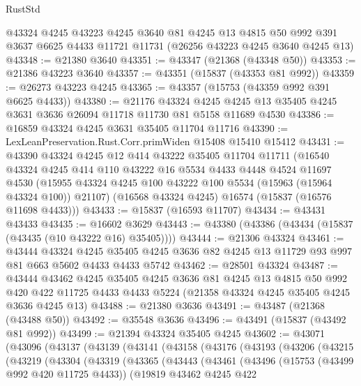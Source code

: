 \begin{lexlean}{RustStd}
\begin{coremodule}
    @43324
    @4245
    @43223
    @4245
    @3640
    @81
    @4245
    @13
    @4815
    @50
    @992
    @391
    @3637
    @6625
    @4433
    @11721
    @11731
    (@26256 @43223 @4245 @3640 @4245 @13)
@43348 := @21380 @3640
@43351 := @43347 (@21368 (@43348 @50))
@43353 := @21386 @43223 @3640
@43357 := @43351 (@15837 (@43353 @81 @992))
@43359 := @26273 @43223 @4245
@43365 := @43357 (@15753 (@43359 @992 @391 @6625 @4433))
@43380 := @21176
    @43324
    @4245
    @4245
    @13
    @35405
    @4245
    @3631
    @3636
    @26094
    @11718
    @11730
    @81
    @5158
    @11689
    @4530
@43386 := @16859 @43324 @4245 @3631 @35405 @11704 @11716
@43390 := LexLeanPreservation.Rust.Corr.primWiden @15408 @15410 @15412
@43431 := @43390
    @43324
    @4245
    @12
    @414
    @43222
    @35405
    @11704
    @11711
    (@16540
      @43324
      @4245
      @414
      @110
      @43222
      @16
      @5534
      @4433
      @4448
      @4524
      @11697
      @4530
      (@15955 @43324 @4245 @100 @43222 @100 @5534 (@15963 (@15964 @43324 @100)) @21107)
      (@16568 @43324 @4245)
      @16574
      (@15837 (@16576 @11698 @4433)))
@43433 := @15837 (@16593 @11707)
@43434 := @43431 @43433
@43435 := @16602 @3629
@43443 := @43380 (@43386 (@43434 (@15837 (@43435 (@10 @43222 @16) @35405))))
@43444 := @21306 @43324
@43461 := @43444
    @43324
    @4245
    @35405
    @4245
    @3636
    @82
    @4245
    @13
    @11729
    @93
    @997
    @81
    @663
    @5602
    @4433
    @4433
    @5742
@43462 := @28501 @43324
@43487 := @43444
    @43462
    @4245
    @35405
    @4245
    @3636
    @81
    @4245
    @13
    @4815
    @50
    @992
    @420
    @422
    @11725
    @4433
    @4433
    @5224
    (@21358 @43324 @4245 @35405 @4245 @3636 @4245 @13)
@43488 := @21380 @3636
@43491 := @43487 (@21368 (@43488 @50))
@43492 := @35548 @3636
@43496 := @43491 (@15837 (@43492 @81 @992))
@43499 := @21394 @43324 @35405 @4245
@43602 := @43071
    (@43096
      (@43137
        (@43139
          (@43141
            (@43158
              (@43176
                (@43193
                  (@43206
                    (@43215
                      (@43219
                        (@43304
                          (@43319
                            (@43365
                              (@43443
                                (@43461
                                  (@43496
                                    (@15753 (@43499 @992 @420 @11725 @4433))
                                    (@19819
                                      @43462
                                      @4245
                                      @422

\end{coremodule}
\end{lexlean}
